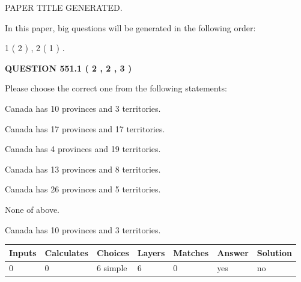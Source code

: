 \documentclass[12pt]{article}
\begin{document}
 
 
 
   
   
 PAPER TITLE GENERATED.
   
   
   
\vspace{0.2in}
   
In this paper, big questions will be generated in the following order: 
   
   
   1 ( 2 )
 ,
   2 ( 1 )
 .
  
\vspace{0.2in}
  
{\textbf{\Large{QUESTION
551.1 
 ( 2 , 2 , 3 )
}}}
  
  
Please choose the correct one from the following statements:
 
 
Canada has 10  provinces and 3 territories.
 
 
Canada has  17 provinces and  17 territories.
 
 
Canada has   4 provinces and  19 territories.
 
 
Canada has  13 provinces and  8 territories.
 
 
Canada has  26 provinces and  5 territories.
 
 
 None of above.
 
 
\noindent{}
 
 
Canada has 10  provinces and 3 territories.
 
 
\noindent{}
 
 
   
   
   
   
\noindent\begin{tabular}{|l|l|l|l|l|l|l|}
 \hline
Inputs & Calculates & Choices & Layers & Matches & Answer & Solution \\ \hline
 0  & 
 0  & 
 6
  simple  
  & 
 6  & 
 0  & 
  yes & 
  no 
  \\ \hline
 \end{tabular}
   
   
   
   
\noindent{}
   
\end{document}

